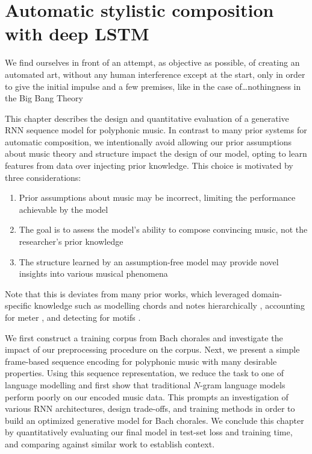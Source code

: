 \chapter{Automatic stylistic composition with deep LSTM}\label{ch:automatic-composition}
\begin{savequote}[75mm]
  We find ourselves in front of an attempt, as objective as possible, of creating
  an automated art, without any human interference except at the start, only in
  order to give the initial impulse and a few premises, like in the case
  of\ldots nothingness in the Big Bang Theory
\end{savequote}
\ifpdf
    \graphicspath{{Chapter4/Figs/Raster/}{Chapter4/Figs/PDF/}{Chapter4/Figs/}}
\else
    \graphicspath{{Chapter4/Figs/Vector/}{Chapter4/Figs/}}
\fi

This chapter describes the design and quantitative evaluation of a generative
RNN sequence model for polyphonic music. In contrast to many prior systems for
automatic composition, we intentionally avoid allowing our prior assumptions
about music theory and structure impact the design of our model, opting to
learn features from data over injecting prior knowledge. This choice is motivated
by three considerations:
\begin{enumerate}
  \item Prior assumptions about music may be incorrect, limiting the performance achievable by the model
  \item The goal is to assess the model's ability to compose convincing music, not the researcher's prior knowledge
  \item The structure learned by an assumption-free model may provide novel insights into various musical phenomena
\end{enumerate}
Note that this is deviates from many prior works, which leveraged
domain-specific knowledge such as modelling chords and notes hierarchically
\citep{hild1991harmonet,mozer1994neural,Eck2002}, accounting for meter
\citep{eck2008learning}, and detecting for motifs \citep{feulner1994melonet}.

We first construct a training corpus from Bach chorales and investigate the
impact of our preprocessing procedure on the corpus. Next, we present a simple
frame-based sequence encoding for polyphonic music with many desirable
properties. Using this sequence representation, we reduce the task to one of
language modelling and first show that traditional $N$-gram language models
perform poorly on our encoded music data. This prompts an investigation of
various RNN architectures, design trade-offs, and training methods in order to
build an optimized generative model for Bach chorales.
We conclude this chapter by quantitatively evaluating our final model in
test-set loss and training time, and comparing against similar work to
establish context.


